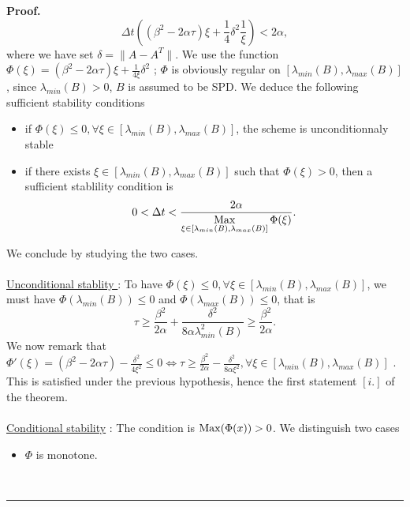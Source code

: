 \documentclass[11pt]{article}
\newenvironment{proof}[1][Proof]{\textbf{#1.} }{\ \rule{0.5em}{0.5em}}
\newcommand{\Frac}[2] {\frac{\textstyle #1} {\textstyle #2}}
\newcommand{\Max}  {\mathop{\rm Max}}
\begin{document}
{\begin{proof}
$$
\Delta t \left( (\beta^2-2\alpha \tau)\xi + \Frac{1}{4}\delta^2\Frac{1}{\xi}\right) < 2\alpha,
$$
where we have set $\delta =\parallel A-A^T\parallel$.
We use the function $\Phi(\xi)= (\beta^2-2\alpha \tau)\xi + \Frac{1}{4\xi}\delta^2$ ; $\Phi$ is obviously regular on $[\lambda_{min}(B),\lambda_{max}(B)]$, since $\lambda_{min}(B) >0$, $B$ is assumed to be SPD.
We deduce the following sufficient stability conditions
\begin{itemize}
\item if $\Phi(\xi) \le 0, \forall \xi \in [\lambda_{min}(B),\lambda_{max}(B)]$, the scheme is unconditionnaly stable
\item if there exists $\xi \in [\lambda_{min}(B),\lambda_{max}(B)]$ such that $\Phi(\xi) >0$, then a sufficient stablility condition is
$$
0<\Delta t<\Frac{2\alpha}{\displaystyle{\Max_{\xi \in [\lambda_{min}(B),\lambda_{max}(B)]}\Phi(\xi)}}.
$$
\end{itemize}
We conclude by studying the two cases.
\\
\\
\underline{Unconditional stablity }:
To have $\Phi(\xi) \le 0, \forall \xi \in [\lambda_{min}(B),\lambda_{max}(B)]$, we must have
$\Phi(\lambda_{min}(B))\le 0$ and $\Phi(\lambda_{max}(B))\le 0$, that is
$$
\tau \ge \Frac{\beta^2}{2\alpha}+\Frac{\delta^2}{8\alpha \lambda^2_{min}(B)} \ge \Frac{\beta^2}{2\alpha}.
$$
We now remark that $\Phi'(\xi)=(\beta^2-2\alpha \tau) -\Frac{\delta^2}{4\xi^2} \le 0 \iff 
\tau \ge \Frac{\beta^2}{2\alpha}-\Frac{\delta^2}{8\alpha \xi^2}, \forall \xi \in [\lambda_{min}(B),\lambda_{max}(B)]$ . This is satisfied under the previous hypothesis, hence the first statement $[i.]$ of the theorem.
\\
\\
\underline{Conditional stability} : The condition is $\Max(\Phi(x)) >0$. We distinguish two cases
\begin{itemize}
\item $\Phi$ is monotone.
\end{itemize}
\end{proof}}
\end{document}
